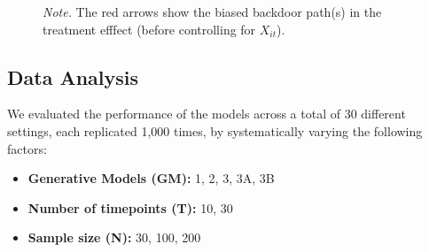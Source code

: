 \documentclass[
  12pt,
  a4paper,
]{article}
\begin{document}
\begin{figure}[H]
\begin{minipage}{0.50\linewidth}
{}

\end{minipage}%
\newline
\begin{minipage}{0.50\linewidth}



\end{minipage}%
%
\begin{minipage}{0.50\linewidth}
\emph{Note.} The red arrows show the biased backdoor path(s) in the
treatment efffect (before controlling for \(X_{it}\)).\end{minipage}%

\end{figure}%

\subsection{Data Analysis}\label{data-analysis}

We evaluated the performance of the models across a total of 30
different settings, each replicated 1,000 times, by systematically
varying the following factors:

\begin{itemize}
\item
  \textbf{Generative Models (GM):} 1, 2, 3, 3A, 3B
\item
  \textbf{Number of timepoints (T):} 10, 30
\item
  \textbf{Sample size (N):} 30, 100, 200
\end{itemize}
\end{document}
